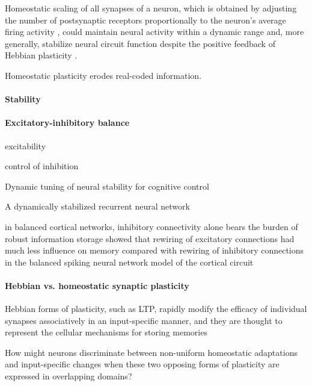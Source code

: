 \documentclass{article}
\theoremstyle{definition} \newtheorem{definition}{Definition}
\theoremstyle{remark} \newtheorem{remark}{Remark}
\newcounter{ct}
\begin{document}
Homeostatic scaling of all synapses of a neuron, which is obtained by adjusting the number of postsynaptic receptors proportionally to the neuron’s average firing activity \citep{turrigiano1998activity,turrigiano1999homeostatic},
 could maintain neural activity within a dynamic range and, more generally, stabilize neural circuit function despite the positive feedback of Hebbian plasticity \citep{toyoizumi2014modeling}. 
 
 \citep{niemeyer2021homeostasis}
 \citep{oleary2018homeostasis}
 
 Homeostatic plasticity erodes real-coded information\citep{susman2019memory}.
 
 \paragraph{Stability}
 \citep{aljaberi2021global}
 
 \paragraph{Excitatory-inhibitory balance}%
 
 excitability \citep{daoudal2003long}
 
 control of inhibition \citep{machens2005flexible}

 Dynamic tuning of neural stability for cognitive control \citep{xu2024dynamic}
 
 A dynamically stabilized recurrent neural network \citep{saab2022stabilized}
 
 in balanced cortical networks, inhibitory connectivity alone bears the burden of robust information storage\citep{mongillo2018inhibitory}
\citep{mongillo2018inhibitory} showed that rewiring of excitatory connections had much less influence on memory compared with rewiring of inhibitory connections in the balanced spiking neural network model of the cortical circuit
 
\paragraph{Hebbian vs. homeostatic synaptic plasticity}
\citep{pozo2010unraveling}
Hebbian forms of plasticity, such as LTP, rapidly modify the efficacy of individual synapses associatively in an input-specific manner, and they are thought to represent the cellular mechanisms for storing memories

How might neurons discriminate between non-uniform homeostatic adaptations and input-specific changes when these two opposing forms of plasticity are expressed in overlapping domains? \citep{rabinowitch2006interplay, rabinowitch2008two}
 
\end{document}
